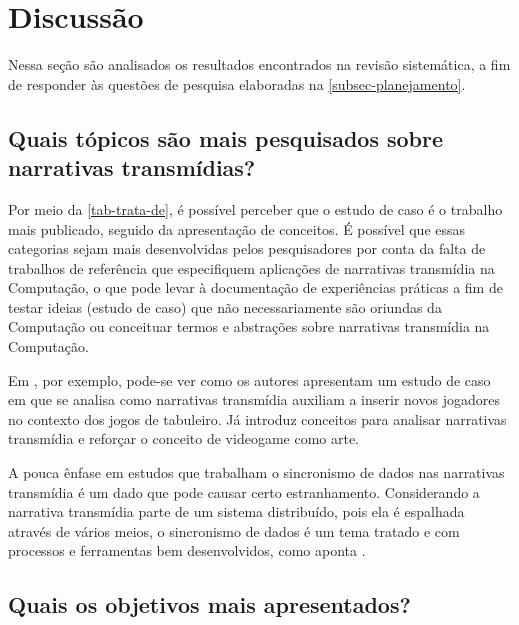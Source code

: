 \documentclass[
article,			%
11pt,				%
oneside,			%
a4paper,			%
english,			%
brazil,				%
sumario=tradicional
]{abntex2}
\begin{document}
  \section{Discussão}

  Nessa seção são analisados os resultados encontrados na revisão sistemática, a fim de responder às questões de pesquisa elaboradas na \autoref{subsec-planejamento}.

  \subsection{Quais tópicos são mais pesquisados sobre narrativas transmídias?}

  Por meio da \autoref{tab-trata-de}, é possível perceber que o estudo de caso é o trabalho mais publicado, seguido da apresentação de conceitos. É possível que essas categorias sejam mais desenvolvidas pelos pesquisadores por conta da falta de trabalhos de referência que especifiquem aplicações de narrativas transmídia na Computação, o que pode levar à documentação de experiências práticas a fim de testar ideias (estudo de caso) que não necessariamente são oriundas da Computação ou conceituar termos e abstrações sobre narrativas transmídia na Computação.

  Em , por exemplo, pode-se ver como os autores apresentam um estudo de caso em que se analisa como narrativas transmídia auxiliam a inserir novos jogadores no contexto dos jogos de tabuleiro. Já  introduz conceitos para analisar narrativas transmídia e reforçar o conceito de videogame como arte.

  A pouca ênfase em estudos que trabalham o sincronismo de dados nas narrativas transmídia é um dado que pode causar certo estranhamento. Considerando a narrativa transmídia parte de um sistema distribuído, pois ela é espalhada através de vários meios, o sincronismo de dados é um tema tratado e com processos e ferramentas bem desenvolvidos, como aponta .

  \subsection{Quais os objetivos mais apresentados?}
\end{document}
